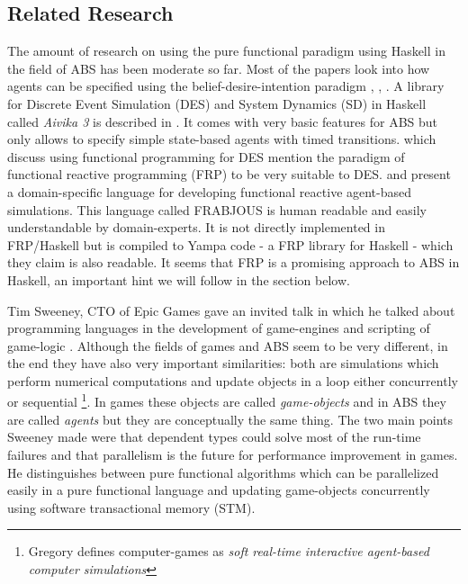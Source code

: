 \subsection{Related Research}
The amount of research on using the pure functional paradigm using Haskell in the field of ABS has been moderate so far. Most of the papers look into how agents can be specified using the belief-desire-intention paradigm \cite{de_jong_suitability_2014}, \cite{sulzmann_specifying_2007}, \cite{jankovic_functional_2007}. A library for Discrete Event Simulation (DES) and System Dynamics (SD) in Haskell called \textit{Aivika 3} is described in \cite{sorokin_aivika_2015}. It comes with very basic features for ABS but only allows to specify simple state-based agents with timed transitions.
\cite{jankovic_functional_2007} which discuss using functional programming for DES mention the paradigm of functional reactive programming (FRP) to be very suitable to DES. \cite{schneider_towards_2012} and \cite{vendrov_frabjous:_2014} present a domain-specific language for developing functional reactive agent-based simulations. This language called FRABJOUS is human readable and easily understandable by domain-experts. It is not directly implemented in FRP/Haskell but is compiled to Yampa code - a FRP library for Haskell - which they claim is also readable. It seems that FRP is a promising approach to ABS in Haskell, an important hint we will follow in the section below.

Tim Sweeney, CTO of Epic Games gave an invited talk in which he talked about programming languages in the development of game-engines and scripting of game-logic \cite{sweeney_next_2006}. Although the fields of games and ABS seem to be very different, in the end they have also very important similarities: both are simulations which perform numerical computations and update objects in a loop either concurrently or sequential \footnote{Gregory \cite{gregory_game_2018} defines computer-games as \textit{soft real-time interactive agent-based computer simulations}}. In games these objects are called \textit{game-objects} and in ABS they are called \textit{agents} but they are conceptually the same thing. The two main points Sweeney made were that dependent types could solve most of the run-time failures and that parallelism is the future for performance improvement in games. He distinguishes between pure functional algorithms which can be parallelized easily in a pure functional language and updating game-objects concurrently using software transactional memory (STM).

